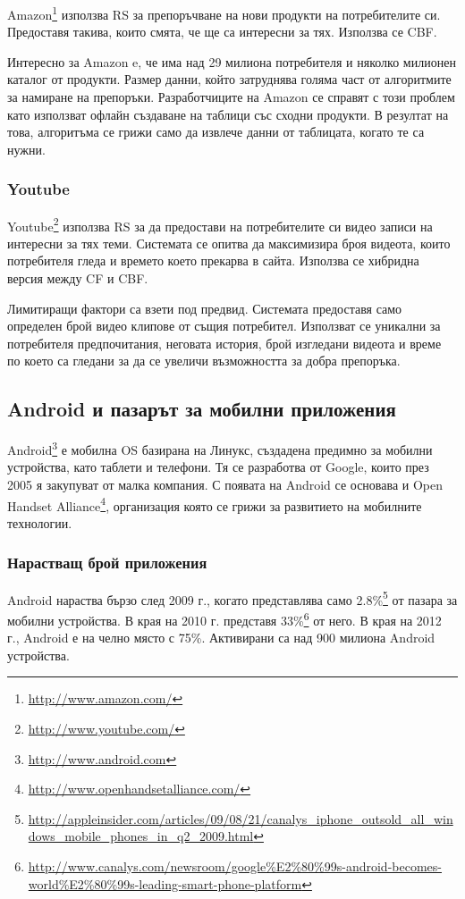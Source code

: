 	Amazon\footnote{\url{http://www.amazon.com/}} използва \ac{RS} за препоръчване на нови продукти на потребителите си. Предоставя такива, които смята, че ще са интересни за тях. Използва се \ac{CBF}.
	
	Интересно за Amazon e, че има над 29 милиона потребителя и няколко милионен каталог от продукти. Размер данни, който затруднява голяма част
	от алгоритмите за намиране на препоръки. Разработчиците на Amazon се справят с този проблем като използват офлайн създаване на таблици със сходни продукти. В резултат на това, алгоритъма се грижи само да извлече данни от таблицата, когато те са нужни.
	
	\subsubsection{Youtube}
	
	Youtube\footnote{\url{http://www.youtube.com/}} използва \ac{RS} за да предостави на потребителите си видео записи на интересни за тях теми. Системата се опитва да максимизира броя видеота, които потребителя гледа и времето което прекарва в сайта. Използва се хибридна версия между \ac{CF} и \ac{CBF}.
	
	Лимитиращи фактори са взети под предвид. Системата предоставя само определен брой видео клипове от същия потребител. Използват се уникални за
	потребителя предпочитания, неговата история, брой изгледани видеота и време по което са гледани за да се увеличи възможността за добра препоръка.
	
	\subsection{Android и пазарът за мобилни приложения}
	
		Android\footnote{\url{http://www.android.com}} е мобилна \ac{OS} базирана на Линукс, създадена предимно за мобилни устройства, като таблети и телефони. Тя се разработва от Google, които през 2005 я закупуват от малка компания\cite{Elgin}. С появата на Android се основава и Open Handset Alliance\footnote{\url{http://www.openhandsetalliance.com/}}, организация която се грижи за развитието на мобилните технологии.
	
	\subsubsection{Нарастващ брой приложения}
	
		Android нараства бързо след 2009 г., когато представлява само 2.8\%\footnote{\url{http://appleinsider.com/articles/09/08/21/canalys_iphone_outsold_all_windows_mobile_phones_in_q2_2009.html}} от пазара за мобилни устройства. В края на 2010 г. представя 33\%\footnote{\url{http://www.canalys.com/newsroom/google\%E2\%80\%99s-android-becomes-world\%E2\%80\%99s-leading-smart-phone-platform}} от него. В края на 2012 г., Android е на челно място с 75\%\cite{IDC}. Активирани са над 900 милиона Android устройства\cite{Google}.
		
